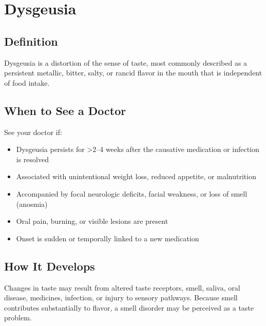 \chapter{Dysgeusia}

\section*{Definition}
Dysgeusia is a distortion of the sense of taste, most commonly described as a persistent metallic, bitter, salty, or rancid flavor in the mouth that is independent of food intake.

\section*{When to See a Doctor}
See your doctor if:
\begin{itemize}
  \item Dysgeusia persists for \textgreater{}2--4 weeks after the causative medication or infection is resolved
  \item Associated with unintentional weight loss, reduced appetite, or malnutrition
  \item Accompanied by focal neurologic deficits, facial weakness, or loss of smell (anosmia)
  \item Oral pain, burning, or visible lesions are present
  \item Onset is sudden or temporally linked to a new medication
\end{itemize}

\section*{How It Develops}
Changes in taste may result from altered taste receptors, smell, saliva, oral disease, medicines, infection, or injury to sensory pathways. Because smell contributes substantially to flavor, a smell disorder may be perceived as a taste problem.

